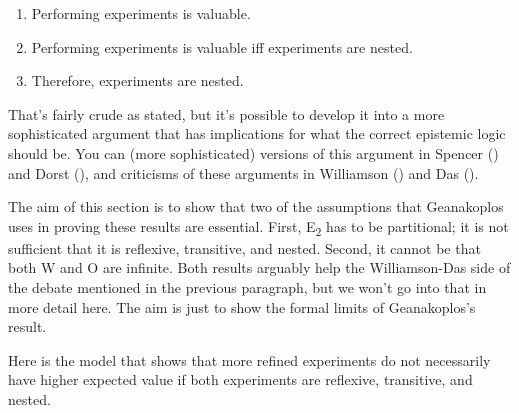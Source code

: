 \documentclass[
  10pt,
  letterpaper,
  DIV=11,
  numbers=noendperiod,
  twoside]{scrartcl}
\providecommand{\tightlist}{%
  \setlength{\itemsep}{0pt}\setlength{\parskip}{0pt}}\usepackage{longtable,booktabs,array}
\begin{document}
\begin{enumerate}
\def\labelenumi{\arabic{enumi}.}
\tightlist
\item
  Performing experiments is valuable.
\item
  Performing experiments is valuable iff experiments are nested.
\item
  Therefore, experiments are nested.
\end{enumerate}

That's fairly crude as stated, but it's possible to develop it into a
more sophisticated argument that has implications for what the correct
epistemic logic should be. You can (more sophisticated) versions of this
argument in Spencer () and Dorst
(), and criticisms of these arguments in
Williamson () and Das
().

The aim of this section is to show that two of the assumptions that
Geanakoplos uses in proving these results are essential. First,
E\textsubscript{2} has to be partitional; it is not sufficient that it
is reflexive, transitive, and nested. Second, it cannot be that both W
and O are infinite. Both results arguably help the Williamson-Das side
of the debate mentioned in the previous paragraph, but we won't go into
that in more detail here. The aim is just to show the formal limits of
Geanakoplos's result.

Here is the model that shows that more refined experiments do not
necessarily have higher expected value if both experiments are
reflexive, transitive, and nested.
\end{document}
